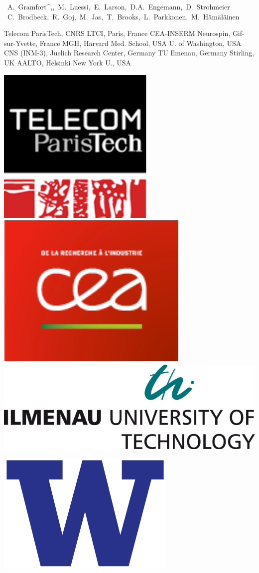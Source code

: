 \documentclass[t,11pt,compress]{beamer} %
\def\name#1{\mbox{\sc #1}}
\begin{document}
\begin{frame}[plain,t,c]
{    \begin{center}
    \mbox{\hspace{-1em}%
    \name{A. Gramfort\PARISTECH^{,}\NSPIN, M. Luessi\MGH, E. Larson\UW, D.A.        
	      Engemann\NSPIN, D. Strohmeier\ILMENAU}}
    \mbox{\hspace{-1em}%
    \name{C. Brodbeck\NYU, R. Goj\STIRLING, M. Jas\AALTO, T. Brooks\NYU, L. Parkkonen\AALTO, M. H\"am\"al\"ainen\MGH}}
	\vspace{0.05cm}
	\def\affilbr{\hspace{0.2cm}}
    \parbox{13cm}{\tiny\center
                 \PARISTECH Telecom ParisTech, CNRS LTCI, Paris, France \affilbr
                 \NSPIN CEA-INSERM Neurospin, Gif-sur-Yvette, France \affilbr
                 \MGH MGH, Harvard Med. School, USA \affilbr
                 \UW U. of Washington, USA\\
                 \JUELICH CNS (INM-3), Juelich Research Center, Germany \affilbr
                 \ILMENAU TU Ilmenau, Germany \affilbr
                 \STIRLING Stirling, UK \affilbr
                 \AALTO AALTO, Helsinki \affilbr
                 \NYU New York U., USA}
    \end{center}
}
%
\hfill
%
\begin{minipage}{0.15\linewidth}
    \vspace{1ex}
    \hfill
    \centerline{%
    \includegraphics[width=0.188\linewidth]{logo_telecom}
    \,
    \includegraphics[width=0.233\linewidth]{logo_cea}
    \,
    \includegraphics[width=0.45\linewidth]{logo_tuil}
    }
    \centerline{%
    \includegraphics[width=0.24\linewidth]{logo_uw}
}
\end{minipage}
\end{frame}
\end{document}
